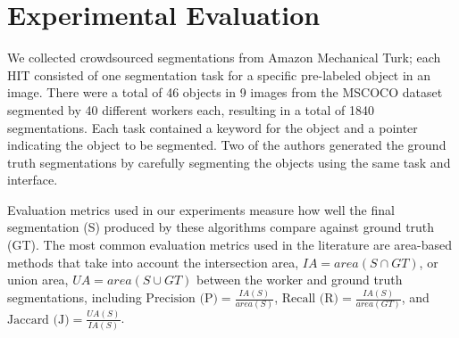 \section{Experimental Evaluation\label{sec:experiment}}

\par \noindent We collected crowdsourced segmentations from Amazon Mechanical Turk; each HIT consisted of one segmentation task for a specific pre-labeled object in an image. There were a total of 46 objects in 9 images from the MSCOCO dataset~\cite{Lin2014} segmented by 40 different workers each, resulting in a total of 1840 segmentations. Each task contained a keyword for the object and a pointer indicating the object to be segmented. Two of the authors generated the ground truth segmentations by carefully segmenting the objects using the same task and interface. %

\par \noindent Evaluation metrics used in our experiments measure how well the final segmentation (S) produced by these algorithms compare against ground truth (GT). The most common evaluation metrics used in the literature are area-based methods  that take into account the intersection area, $IA=area(S\cap GT)$, or union area, $UA=area(S\cup GT)$ between the worker and ground truth segmentations, including %
    $\text{Precision (P)} = \frac{IA(S)}{area(S)}$, 
    $\text{Recall (R)} = \frac{IA(S)}{area(GT)}$, and 
    $\text{Jaccard (J)} = \frac{UA(S)}{IA(S)}$.

